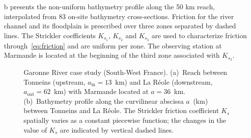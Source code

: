 b presents the non-uniform bathymetry profile along the 50 km reach, interpolated from $83$ on-site bathymetry cross-sections. Friction for the river channel and its floodplain is prescribed over three zones separated by dashed lines. The Strickler coefficients $K_{s_1}$, $K_{s_2}$ and $K_{s_3}$ are used to characterize friction through~\cref{eq:friction} and are uniform per zone. The observing station at Marmande is located at the beginning of the third zone associated with $K_{s_3}$. 

\begin{figure}[!ht]
\centering
{}
     
\caption{Garonne River case study (South-West France). (a)~Reach between Tonneins (upstream, $a_{\text{in}} = 13$~km) and La Réole (downstream, $a_{\text{out}} = 62$~km) with Marmande located at $a = 36$~km. (b)~Bathymetry profile along the curvilinear abscissa $a$~(km) between Tonneins and La Réole. The Strickler friction coefficient $K_s$ spatially varies as a constant piecewise function; the changes in the value of $K_s$ are indicated by vertical dashed lines.}
\label{fig:garonne}
\end{figure}

